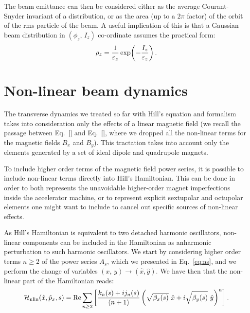 The beam emittance can then be considered either as the average Courant-Snyder invariant of a distribution, or as the area (up to a $2\pi$ factor) of the orbit of the rms particle of the beam. A useful implication of this is that a Gaussian beam distribution in $(\phi_z,\,I_z)$ co-ordinate assumes the practical form:
%
\begin{equation}
\rho_z = \frac{1}{\varepsilon_z}\exp(-\frac{I_z}{\varepsilon_z})\,.
\end{equation}
%



\section{Non-linear beam dynamics}\label{sec:non-linear}

The transverse dynamics we treated so far with Hill's equation and formalism takes into consideration only the effects of a linear magnetic field (we recall the passage between Eq.~\eqref{} and Eq.~\eqref{}, where we dropped all the non-linear terms for the magnetic fields $B_x$ and $B_y$). This tractation takes into account only the elements generated by a set of ideal dipole and quadrupole magnets.

To include higher order terms of the magnetic field power series, it is possible to include non-linear terms directly into Hill's Hamiltonian. This can be done in order to both represents the unavoidable higher-order magnet imperfections inside the accelerator machine, or to represent explicit sextupolar and octupolar elements one might want to include to cancel out specific sources of non-linear effects. 

As Hill's Hamiltonian is equivalent to two detached harmonic oscillators, non-linear components can be included in the Hamiltonian as anharmonic perturbation to such harmonic oscillators. We start by considering higher order terms $n \ge 2$ of the power series $A_s$, which we presented in Eq.~\eqref{eq:as}, and we perform the change of variables $(x,\,y) \to (\hat x, \hat y)$. We have then that the non-linear part of the Hamiltonian reads:
%
\begin{equation}
    \mathcal{H}_\text{nlin}(\hat x, \hat p_x, s) = \Re \sum_{n\ge 2} \qty[\frac{k_n(s) + ij_n(s)}{(n+1)} \left(\sqrt{\beta_x(s)}\ \hat x + i\sqrt{\beta_y(s)}\ \hat y\right)^n]\,.
\end{equation}  

